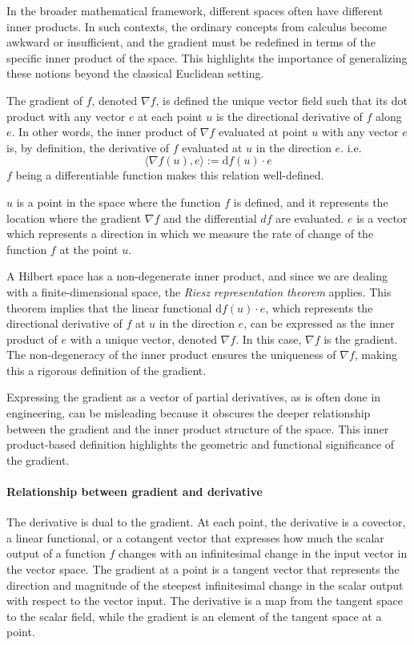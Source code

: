 \documentclass{article}
\begin{document}
\begin{enumerate}[start=9]
\begin{enumerate}
\begin{ans_box}
    In the broader mathematical framework, different spaces often have different inner products. In such contexts, the ordinary concepts from calculus become awkward or insufficient, and the gradient must be redefined in terms of the specific inner product of the space. This highlights the importance of generalizing these notions beyond the classical Euclidean setting.\medskip

    The gradient of $f$, denoted $\nabla f$, is defined the unique vector field such that its dot product with any vector $e$ at each point $u$ is the directional derivative of $f$ along $e$. In other words, the inner product of $\nabla f$ evaluated at point $u$ with any vector $e$ is, by definition, the derivative of $f$ evaluated at $u$ in the direction $e$. i.e.
    $$
    \langle\nabla f(u), e\rangle:=\text{d}f(u)\cdot e
    $$
    $f$ being a differentiable function makes this relation well-defined.\medskip

    $u$ is a point in the space where the function $f$ is defined, and it represents the location where the gradient $\nabla f$ and the differential $df$ are evaluated. $e$ is a vector which represents a direction in which we measure the rate of change of the function $f$ at the point $u$.\medskip

    A Hilbert space has a non-degenerate inner product, and since we are dealing with a finite-dimensional space, the \textit{Riesz representation theorem} applies. This theorem implies that the linear functional $\text{d}f(u)\cdot e$, which represents the directional derivative of $f$ at $u$ in the direction $e$, can be expressed as the inner product of $e$ with a unique vector, denoted $\nabla f$. In this case, $\nabla f$ is the gradient. The non-degeneracy of the inner product ensures the uniqueness of $\nabla f$, making this a rigorous definition of the gradient.\medskip

    Expressing the gradient as a vector of partial derivatives, as is often done in engineering, can be misleading because it obscures the deeper relationship between the gradient and the inner product structure of the space. This inner product-based definition highlights the geometric and functional significance of the gradient.\medskip

    \paragraph{Relationship between gradient and derivative}
    The derivative is dual to the gradient. At each point, the derivative is a covector, a linear functional, or a cotangent vector that expresses how much the scalar output of a function $f$ changes with an infinitesimal change in the input vector in the vector space. The gradient at a point is a tangent vector that represents the direction and magnitude of the steepest infinitesimal change in the scalar output with respect to the vector input. The derivative is a map from the tangent space to the scalar field, while the gradient is an element of the tangent space at a point.\medskip


\end{ans_box}
\end{enumerate}
\end{enumerate}
\end{document}
